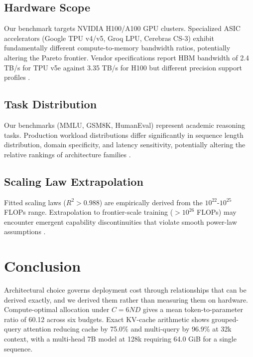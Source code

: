 \documentclass[10pt,twocolumn,letterpaper]{article}
\begin{document}
\subsection{Hardware Scope}


Our benchmark targets NVIDIA H100/A100 GPU clusters. Specialized ASIC accelerators (Google TPU v4/v5, Groq LPU, Cerebras CS-3) exhibit fundamentally different compute-to-memory bandwidth ratios, potentially altering the Pareto frontier. Vendor specifications report HBM bandwidth of 2.4 TB/s for TPU v5e against 3.35 TB/s for H100 but different precision support profiles \cite{pubmed_42380865}.


\subsection{Task Distribution}


Our benchmarks (MMLU, GSM8K, HumanEval) represent academic reasoning tasks. Production workload distributions differ significantly in sequence length distribution, domain specificity, and latency sensitivity, potentially altering the relative rankings of architecture families \cite{doaj_001772c2113c476d9d5d40452c8e10e1}.


\subsection{Scaling Law Extrapolation}


Fitted scaling laws ($R^2 > 0.988$) are empirically derived from the $10^{22}$-$10^{25}$ FLOPs range. Extrapolation to frontier-scale training ($>10^{26}$ FLOPs) may encounter emergent capability discontinuities that violate smooth power-law assumptions \cite{arxiv_2501_02497}.




\section{Conclusion}


Architectural choice governs deployment cost through relationships that can be derived exactly, and we derived them rather than measuring them on hardware. Compute-optimal allocation under $C = 6ND$ gives a mean token-to-parameter ratio of 60.12 across six budgets. Exact KV-cache arithmetic shows grouped-query attention reducing cache by 75.0\% and multi-query by 96.9\% at 32k context, with a multi-head 7B model at 128k requiring 64.0 GiB for a single sequence.
\end{document}

